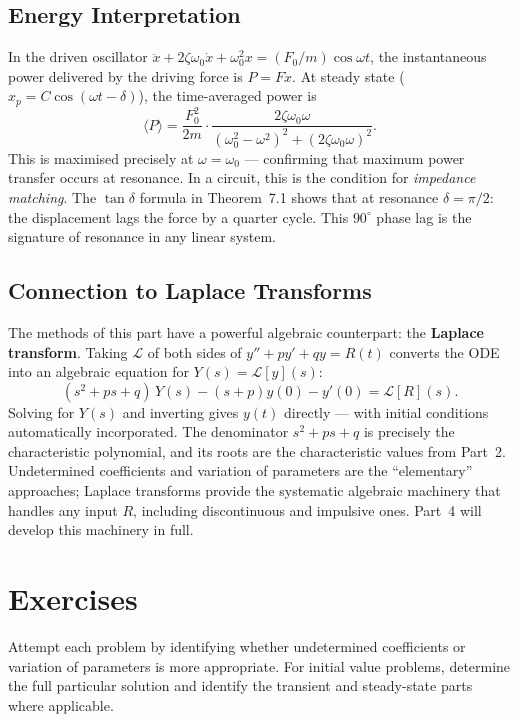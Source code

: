 \documentclass[12pt,a4paper]{article}
\begin{document}
\subsection{Energy Interpretation}

In the driven oscillator $\ddot x + 2\zeta\omega_0\dot x + \omega_0^2 x = (F_0/m)\cos\omega t$,
the instantaneous power delivered by the driving force is $P = F\dot x$. At steady
state ($x_p = C\cos(\omega t - \delta)$), the time-averaged power is
\[
  \langle P\rangle = \frac{F_0^2}{2m}\cdot\frac{2\zeta\omega_0\omega}{(\omega_0^2-\omega^2)^2+(2\zeta\omega_0\omega)^2}.
\]
This is maximised precisely at $\omega = \omega_0$ --- confirming that maximum power
transfer occurs at resonance. In a circuit, this is the condition for \emph{impedance
matching}. The $\tan\delta$ formula in Theorem~7.1 shows that at resonance
$\delta = \pi/2$: the displacement lags the force by a quarter cycle. This $90^\circ$
phase lag is the signature of resonance in any linear system.

\subsection{Connection to Laplace Transforms}

The methods of this part have a powerful algebraic counterpart: the
\textbf{Laplace transform}. Taking $\mathcal{L}$ of both sides of
$y'' + py' + qy = R(t)$ converts the ODE into an algebraic equation for
$Y(s) = \mathcal{L}[y](s)$:
\[
  (s^2 + ps + q)\,Y(s) - (s+p)y(0) - y'(0) = \mathcal{L}[R](s).
\]
Solving for $Y(s)$ and inverting gives $y(t)$ directly --- with initial conditions
automatically incorporated. The denominator $s^2+ps+q$ is precisely the
characteristic polynomial, and its roots are the characteristic values from
Part~2. Undetermined coefficients and variation of parameters are the ``elementary''
approaches; Laplace transforms provide the systematic algebraic machinery that
handles any input $R$, including discontinuous and impulsive ones. Part~4 will
develop this machinery in full.

\section{Exercises}

Attempt each problem by identifying whether undetermined coefficients or variation
of parameters is more appropriate. For initial value problems, determine the full
particular solution and identify the transient and steady-state parts where applicable.
\end{document}
